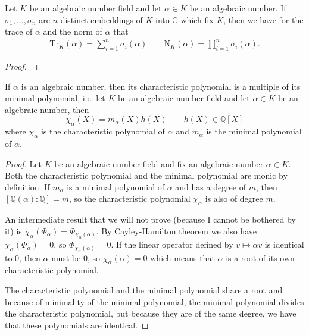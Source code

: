 \begin{thmbox}
    \begin{proposition}
        Let \(K\) be an algebraic number field and let \(\alpha \in K\) be an algebraic number. If \(\sigma_1, \ldots, \sigma_n\) are \(n\) distinct embeddings of \(K\) into \(\mathbb{C}\) which fix \(K\), then we have for the trace of \(\alpha\) and the norm of \(\alpha\) that
        \begin{align*}
            \mathrm{Tr}_K(\alpha) = \sum_{i=1}^n \sigma_i(\alpha) \qquad \mathrm{N}_K(\alpha) = \prod_{i=1}^n \sigma_i(\alpha)\text{.}
        \end{align*}
    \end{proposition}
\end{thmbox}
\begin{proof}
    
\end{proof}

\begin{thmbox}
    \begin{proposition}
        If \(\alpha\) is an algebraic number, then its characteristic polynomial is a multiple of its minimal polynomial, i.e. let \(K\) be an algebraic number field and let \(\alpha \in K\) be an algebraic number, then
        \begin{equation*}
            \chi_\alpha(X) = m_\alpha(X) h(X) \qquad h(X) \in \mathbb{Q}[X]
        \end{equation*}
        where \(\chi_\alpha\) is the characteristic polynomial of \(\alpha\) and \(m_\alpha\) is the minimal polynomial of \(\alpha\).
    \end{proposition}
\end{thmbox}
\begin{proof}
    Let \(K\) be an algebraic number field and fix an algebraic number \(\alpha \in K\). Both the characteristic polynomial and the minimal polynomial are monic by definition. If \(m_\alpha\) is a minimal polynomial of \(\alpha\) and has a degree of \(m\), then \([\mathbb{Q}(\alpha) : \mathbb{Q}] = m\), so the characteristic polynomial \(\chi_\alpha\) is also of degree \(m\).

    An intermediate result that we will not prove (because I cannot be bothered by it) is \(\chi_\alpha(\Phi_\alpha) = \Phi_{\chi_\alpha(\alpha)}\). By Cayley-Hamilton theorem we also have \(\chi_\alpha(\Phi_\alpha) = 0\), so \(\Phi_{\chi_\alpha(\alpha)} = 0\). If the linear operator defined by \(v \mapsto \alpha v\) is identical to \(0\), then \(\alpha\) must be \(0\), so \(\chi_\alpha(\alpha) = 0\) which means that \(\alpha\) is a root of its own characteristic polynomial.

    The characteristic polynomial and the minimal polynomial share a root and because of minimality of the minimal polynomial, the minimal polynomial divides the characteristic polynomial, but because they are of the same degree, we have that these polynomials are identical.
\end{proof}

